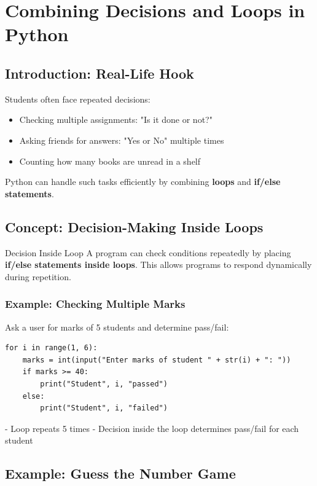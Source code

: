 \chapter{Combining Decisions and Loops in Python}

\section{Introduction: Real-Life Hook}

Students often face repeated decisions:

\begin{itemize}
    \item Checking multiple assignments: "Is it done or not?"  
    \item Asking friends for answers: "Yes or No" multiple times  
    \item Counting how many books are unread in a shelf  
\end{itemize}

Python can handle such tasks efficiently by combining \textbf{loops} and \textbf{if/else statements}.

\section{Concept: Decision-Making Inside Loops}

\begin{definition}{Decision Inside Loop}
A program can check conditions repeatedly by placing \textbf{if/else statements inside loops}.  
This allows programs to respond dynamically during repetition.
\end{definition}

\subsection{Example: Checking Multiple Marks}

Ask a user for marks of 5 students and determine pass/fail:

\begin{verbatim}
for i in range(1, 6):
    marks = int(input("Enter marks of student " + str(i) + ": "))
    if marks >= 40:
        print("Student", i, "passed")
    else:
        print("Student", i, "failed")
\end{verbatim}

- Loop repeats 5 times  
- Decision inside the loop determines pass/fail for each student

\section{Example: Guess the Number Game}


